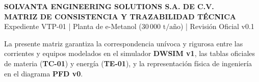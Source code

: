 \documentclass[11pt,letterpaper]{article}
\begin{document}
\begin{center}
{\large \textbf{SOLVANTA ENGINEERING SOLUTIONS S.A. DE C.V.}}\\[0.2cm]
{\Large \textbf{\color{navyblue} MATRIZ DE CONSISTENCIA Y TRAZABILIDAD TÉCNICA}}\\[0.1cm]
{\small Expediente VTP-01 | Planta de e-Metanol ($30\,000\text{ t/año}$) | Revisión Oficial v0.1}
\end{center}

\vspace{0.2cm}
\noindent La presente matriz garantiza la correspondencia unívoca y rigurosa entre las corrientes y equipos modelados en el simulador \textbf{DWSIM v1}, las tablas oficiales de materia (\textbf{TC-01}) y energía (\textbf{TE-01}), y la representación física de ingeniería en el diagrama \textbf{PFD v0}.
\end{document}
